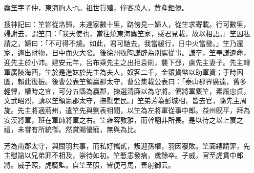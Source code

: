 
\begin{pinyinscope}
麋笁字子仲，東海朐人也。祖世貨殖，僮客萬人，貲產鉅億。

搜神記曰：笁甞從洛歸，未達家數十里，路傍見一婦人，從笁求寄載。行可數里，婦謝去，謂笁曰：「我天使也，當往燒東海麋笁家，感君見載，故以相語。」笁因私請之，婦曰：「不可得不燒。如此，君可馳去，我當緩行，日中火當發。」笁乃還家，遽出財物，日中而火大發。後徐州牧陶謙辟為別駕從事。謙卒，笁奉謙遺命，迎先主於小沛。建安元年，呂布乘先主之出拒袁術，襲下邳，虜先主妻子。先主轉軍廣陵海西，笁於是進妹於先主為夫人，奴客二千，金銀貨幣以助軍資；于時困匱，賴此復振。後曹公表笁領嬴郡太守，曹公集載公表曰：「泰山郡界廣遠，舊多輕悍，權時之宜，可分五縣為嬴郡，揀選清廉以為守將。偏將軍麋笁，素履忠貞，文武昭烈，請以笁領嬴郡太守，撫慰吏民。」笁弟芳為彭城相，皆去官，隨先主周旋。先主將適荊州，遣笁先與劉表相聞，以笁為左將軍從事中郎。益州旣平，拜為安漢將軍，班在軍師將軍之右。笁雍容敦雅，而幹翮非所長。是以待之以上賔之禮，未甞有所統御。然賞賜優寵，無與為比。

芳為南郡太守，與關羽共事，而私好攜貳，叛迎孫權，羽因覆敗。笁面縛請罪，先主慰諭以兄弟罪不相及，崇待如初。笁慙恚發病，歲餘卒。子威，官至虎賁中郎將。威子照，虎騎監。自笁至照，皆便弓馬，善射御云。


\end{pinyinscope}